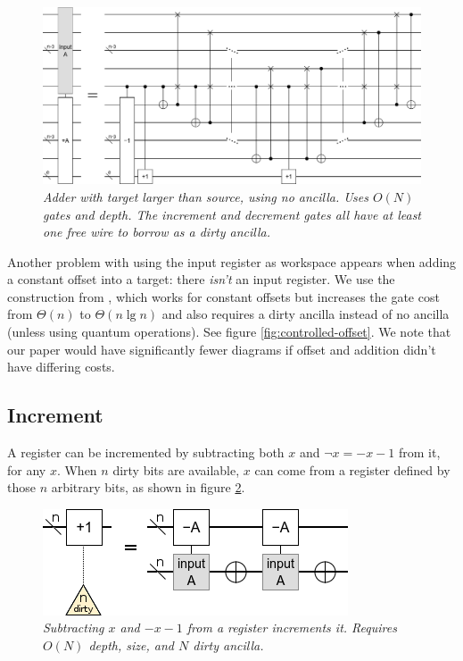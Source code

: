 \documentclass[twocolumn]{article}
\begin{document}
\begin{figure}
  \centering
  \includegraphics[width=\linewidth]{assets/inline-adder-into-large.png}
  \caption{\em
      Adder with target larger than source, using no ancilla.
      Uses $O(N)$ gates and depth.
      The increment and decrement gates all have at least one free wire to borrow as a dirty ancilla.}
  \label{fig:inline-adder-into-large}
\end{figure}

Another problem with using the input register as workspace appears when adding a constant offset into a target: there {\em isn't} an input register.
We use the construction from \cite{haner2016}, which works for constant offsets but increases the gate cost from $\Theta(n)$ to $\Theta(n \lg n)$ and also requires a dirty ancilla instead of no ancilla (unless using quantum operations).
See figure \ref{fig:controlled-offset}.
We note that our paper would have significantly fewer diagrams if offset and addition didn't have differing costs.


\subsection{Increment}

A register can be incremented by subtracting both $x$ and $\neg x = -x-1$ from it, for any $x$.
When $n$ dirty bits are available, $x$ can come from a register defined by those $n$ arbitrary bits, as shown in figure \ref{fig:increment-many-dirty}.

\begin{figure}
  \centering
  \includegraphics[width=\linewidth]{assets/increment-many-dirty.png}
  \caption{\em Subtracting $x$ and $-x-1$ from a register increments it. Requires $O(N)$ depth, size, and $N$ dirty ancilla.}
  \label{fig:increment-many-dirty}
\end{figure}
\end{document}
